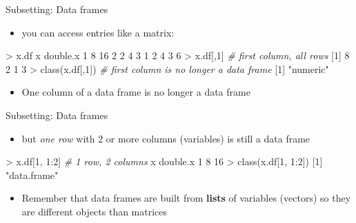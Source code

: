 \documentclass[
  ignorenonframetext,
]{beamer}
\newenvironment{Shaded}{\begin{snugshade}}{\end{snugshade}}
\newcommand{\CommentTok}[1]{\textcolor[rgb]{0.56,0.35,0.01}{\textit{#1}}}
\newcommand{\DecValTok}[1]{\textcolor[rgb]{0.00,0.00,0.81}{#1}}
\newcommand{\FunctionTok}[1]{\textcolor[rgb]{0.00,0.00,0.00}{#1}}
\newcommand{\NormalTok}[1]{#1}
\newcommand{\SpecialCharTok}[1]{\textcolor[rgb]{0.00,0.00,0.00}{#1}}
\newcommand{\StringTok}[1]{\textcolor[rgb]{0.31,0.60,0.02}{#1}}
\providecommand{\tightlist}{%
  \setlength{\itemsep}{0pt}\setlength{\parskip}{0pt}}
\begin{document}
\begin{frame}[fragile]{Subsetting: Data frames}
\protect\hypertarget{subsetting-data-frames}{}
\begin{itemize}[<+->]
\tightlist
\item
  you can access entries like a matrix:
\end{itemize}

\begin{Shaded}
\begin{Highlighting}[]
\SpecialCharTok{\textgreater{}}\NormalTok{ x.df}
\NormalTok{  x double.x}
\DecValTok{1} \DecValTok{8}       \DecValTok{16}
\DecValTok{2} \DecValTok{2}        \DecValTok{4}
\DecValTok{3} \DecValTok{1}        \DecValTok{2}
\DecValTok{4} \DecValTok{3}        \DecValTok{6}
\SpecialCharTok{\textgreater{}}\NormalTok{ x.df[,}\DecValTok{1}\NormalTok{]  }\CommentTok{\# first column, all rows}
\NormalTok{[}\DecValTok{1}\NormalTok{] }\DecValTok{8} \DecValTok{2} \DecValTok{1} \DecValTok{3}
\SpecialCharTok{\textgreater{}} \FunctionTok{class}\NormalTok{(x.df[,}\DecValTok{1}\NormalTok{])  }\CommentTok{\# first column is no longer a data frame}
\NormalTok{[}\DecValTok{1}\NormalTok{] }\StringTok{"numeric"}
\end{Highlighting}
\end{Shaded}

\begin{itemize}[<+->]
\tightlist
\item
  One column of a data frame is no longer a data frame
\end{itemize}
\end{frame}

\begin{frame}[fragile]{Subsetting: Data frames}
\protect\hypertarget{subsetting-data-frames-1}{}
\begin{itemize}[<+->]
\tightlist
\item
  but \emph{one row} with 2 or more columns (variables) is still a data
  frame
\end{itemize}

\begin{Shaded}
\begin{Highlighting}[]
\SpecialCharTok{\textgreater{}}\NormalTok{ x.df[}\DecValTok{1}\NormalTok{, }\DecValTok{1}\SpecialCharTok{:}\DecValTok{2}\NormalTok{]  }\CommentTok{\# 1 row, 2 columns}
\NormalTok{  x double.x}
\DecValTok{1} \DecValTok{8}       \DecValTok{16}
\SpecialCharTok{\textgreater{}} \FunctionTok{class}\NormalTok{(x.df[}\DecValTok{1}\NormalTok{, }\DecValTok{1}\SpecialCharTok{:}\DecValTok{2}\NormalTok{])}
\NormalTok{[}\DecValTok{1}\NormalTok{] }\StringTok{"data.frame"}
\end{Highlighting}
\end{Shaded}

\begin{itemize}[<+->]
\tightlist
\item
  Remember that data frames are built from \textbf{lists} of variables
  (vectors) so they are different objects than matrices
\end{itemize}
\end{frame}
\end{document}
